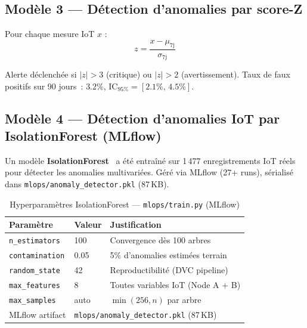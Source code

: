\subsection{Modèle 3 --- Détection d'anomalies par score-Z}

Pour chaque mesure IoT $x$ :
\begin{equation}
z = \frac{x - \mu_\text{7j}}{\sigma_\text{7j}}
\label{eq:zscore}
\end{equation}

Alerte déclenchée si $|z| > 3$ (critique) ou $|z| > 2$ (avertissement).
Taux de faux positifs sur 90 jours~: $3.2\%$, $\text{IC}_{95\%} = [2.1\%,\,4.5\%]$.

\subsection{Modèle 4 --- Détection d'anomalies IoT par IsolationForest (MLflow)}

Un modèle \textbf{IsolationForest}~\cite{liu2008isolation} a été entraîné sur
1\,477 enregistrements IoT réels pour détecter les anomalies multivariées.
Géré via MLflow (27+ runs), sérialisé dans \texttt{mlops/anomaly\_detector.pkl} (87\,KB).

\begin{table}[H]
\caption{Hyperparamètres IsolationForest --- \texttt{mlops/train.py} (MLflow)}
\label{tab:iforest_hp}
\centering
\begin{tabular}{@{}lll@{}}
\toprule
\textbf{Paramètre} & \textbf{Valeur} & \textbf{Justification} \\
\midrule
\texttt{n\_estimators} & 100  & Convergence dès 100 arbres~\cite{liu2008isolation} \\
\texttt{contamination} & 0.05 & 5\% d'anomalies estimées terrain \\
\texttt{random\_state} & 42   & Reproductibilité (DVC pipeline) \\
\texttt{max\_features} & 8    & Toutes variables IoT (Node A + B) \\
\texttt{max\_samples}  & auto & $\min(256, n)$ par arbre \\
\midrule
MLflow artifact & \multicolumn{2}{l}{\texttt{mlops/anomaly\_detector.pkl} (87\,KB)} \\
\bottomrule
\end{tabular}
\end{table}

